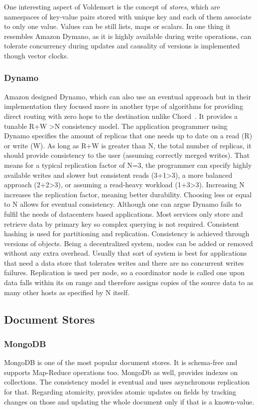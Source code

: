 	One interesting aspect of Voldemort is the concept of \emph{stores}, which are namespaces of key-value pairs stored with unique key and each of them associate to only one value. Values can be still lists, maps or scalars. In one thing it resembles Amazon Dymano, as it is highly available during write operations, can tolerate concurrency during updates and causality of versions is implemented though vector clocks.

	\subsubsection{Dynamo}
	Amazon designed Dynamo, which can also use an eventual approach but in their implementation they focused more in another type of algorithms for providing direct routing with zero hops to the destination unlike Chord~\cite{Stoica:2001}. It provides a tunable R+W \textgreater N consistency model. The application programmer using Dynamo specifies the amount of replicas that one needs up to date on a read (R) or write (W). As long as R+W is greater than N, the total number of replicas, it should provide consistency to the user (assuming correctly merged writes). That means for a typical replication factor of N=3, the programmer can specify highly available writes and slower but consistent reads (3+1\textgreater3), a more balanced approach (2+2>3), or assuming a read-heavy workload (1+3\textgreater3). Increasing N increases the replication factor, meaning better durability. Choosing  less or equal to N allows for eventual consistency. Although one can argue Dynamo fails to fulfil the needs of datacenters based applications.
	Most services only store and retrieve data by primary key so complex querying is not required. Consistent hashing is used for partitioning and replication. Consistency is achieved through versions of objects. Being a decentralized system, nodes can be added or removed without any extra overhead. Usually that sort of system is best for applications that need a data store that tolerates writes and there are no concurrent writes failures.
	Replication is used per node, so a coordinator node is called one upon data falls within its on range and therefore assigns copies of the source data to as many other hosts as specified by N itself.


\subsection{Document Stores}
	\subsubsection{MongoDB}
	MongoDB is one of the most popular document stores. It is schema-free and supports Map-Reduce operations too. MongoDb as well, provides indexes on collections. The consistency model is eventual and uses asynchronous replication for that. Regarding atomicity, provides atomic updates on fields by tracking changes on those and updating the whole document only if that is a known-value.
	

